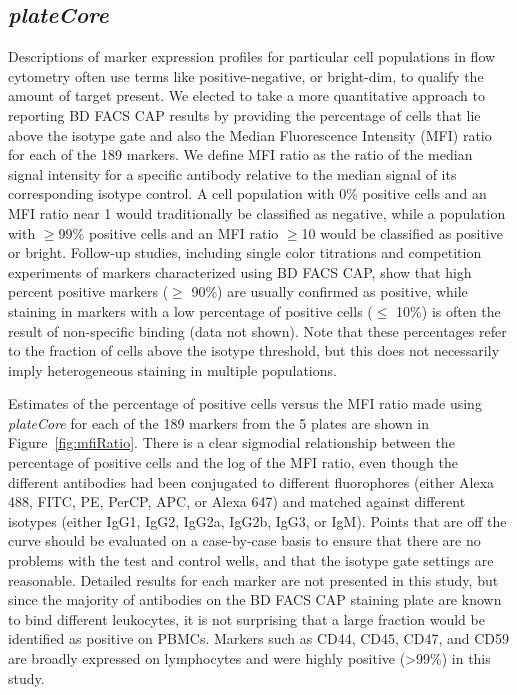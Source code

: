 \documentclass[12pt]{article}
\newcommand{\Rpackage}[1]{{\textit{#1}}}
\begin{document}
\subsection*{\Rpackage{plateCore}}

Descriptions of marker expression profiles for particular cell populations in
flow cytometry often use terms like positive-negative, or bright-dim, to
qualify the amount of target present. We elected to take a more quantitative
approach to reporting BD FACS CAP results by providing the percentage of cells
that lie above the isotype gate and also the Median Fluorescence Intensity (MFI)
ratio for each of the 189 markers. We define MFI ratio as the ratio of
the median signal intensity for a specific antibody relative to the median
signal of its corresponding isotype control. A cell population with 0\%
positive cells and an MFI ratio near 1 would traditionally be classified as
negative, while a population with $\ge$99\% positive cells and an MFI ratio
$\ge$10 would be classified as positive or bright. Follow-up studies, including
single color titrations and competition experiments of markers characterized
using BD FACS CAP, show that high percent positive markers ($\ge$ 90\%) are
usually confirmed as positive, while staining in markers with a low percentage
of positive cells ($\le$ 10\%) is often the result of non-specific binding (data
not shown). Note that these percentages refer to the fraction of cells above
the isotype threshold, but this does not necessarily imply heterogeneous
staining in multiple populations.

Estimates of the percentage of positive cells versus the MFI ratio made using
\Rpackage{plateCore} for each of the 189 markers from the 5 plates are shown
in Figure~\ref{fig:mfiRatio}. There is a clear sigmodial relationship
between the percentage of positive cells and the log of the MFI ratio, even
though the different antibodies had been conjugated to different fluorophores
(either Alexa 488, FITC, PE, PerCP, APC, or Alexa 647) and matched against
different isotypes (either IgG1, IgG2, IgG2a, IgG2b, IgG3, or IgM). Points that
are off the curve should be evaluated on a case-by-case basis to ensure that
there are no problems with the test and control wells, and that the isotype
gate settings are reasonable. Detailed results for each marker are not
presented in this study, but since the majority of antibodies on the BD FACS CAP staining plate are known to bind
different leukocytes, it is not surprising that a large fraction would be
identified as positive on PBMCs. Markers such as CD44, CD45, CD47, and CD59 are
broadly expressed on lymphocytes and were highly positive (>99\%) in this study. 
\end{document}
